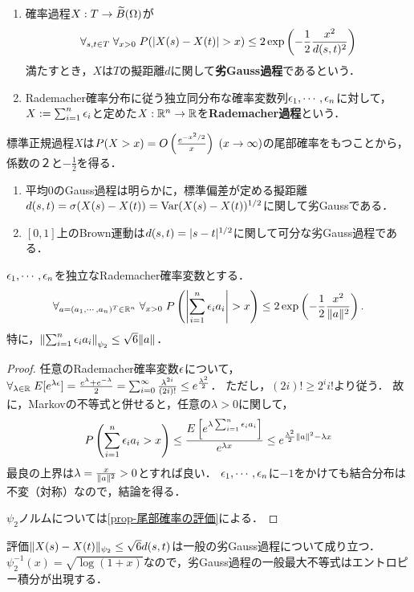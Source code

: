 \documentclass[uplatex,dvipdfmx]{jsreport}
\begin{document}
\begin{definition}\mbox{}
    \begin{enumerate}
        \item 確率過程$X:T\to\widetilde{B}(\Omega)$が
        \[\forall_{s,t\in T}\;\forall_{x>0}\;P(\lvert X(s)-X(t)\rvert>x)\le 2\exp\left(-\frac{1}{2}\frac{x^2}{d(s,t)^2}\right)\]
        満たすとき，$X$は$T$の擬距離$d$に関して\textbf{劣Gauss過程}であるという．
        \item Rademacher確率分布に従う独立同分布な確率変数列$\epsilon_1,\cdots,\epsilon_n$に対して，$X:=\sum^n_{i=1}\epsilon_i$と定めた$X:\mathbb{R}^n\to\mathbb{R}$を\textbf{Rademacher過程}という．
    \end{enumerate}
\end{definition}
\begin{remarks}
    標準正規過程$X$は$P(X>x)=O\left(\frac{e^{-x^2/2}}{x}\right)\;(x\to\infty)$の尾部確率をもつことから，係数の２と$-\frac{1}{2}$を得る．
\end{remarks}
\begin{example}\mbox{}
    \begin{enumerate}
        \item 平均$0$のGauss過程は明らかに，標準偏差が定める擬距離$d(s,t)=\sigma(X(s)-X(t))=\mathrm{Var}(X(s)-X(t))^{1/2}$に関して劣Gaussである．
        \item $[0,1]$上のBrown運動は$d(s,t)=\lvert s-t\rvert^{1/2}$に関して可分な劣Gauss過程である．
    \end{enumerate}
\end{example}

\begin{proposition}[Hoeffdingの不等式]
    $\epsilon_1,\cdots,\epsilon_n$を独立なRademacher確率変数とする．
    \[\forall_{a=(a_1,\cdots,a_n)^T\in\R^n}\;\forall_{x>0}\;P\paren{\Abs{\sum^n_{i=1}\ep_ia_i}>x}\le 2\exp\paren{-\frac{1}{2}\frac{x^2}{\norm{a}^2}}.\]
    特に，$\left\|\sum^n_{i=1}\epsilon_ia_i\right\|_{\psi_2}\le\sqrt{6}\|a\|$．
\end{proposition}
\begin{proof}
    任意のRademacher確率変数$\epsilon$について，$\forall_{\lambda\in\mathbb{R}}\;E[e^{\lambda\epsilon}]=\frac{e^\lambda+e^{-\lambda}}{2}=\sum^\infty_{i=0}\frac{\lambda^{2i}}{(2i)!}\le e^{\frac{\lambda^2}{2}}$．
    ただし，$(2i)!\ge 2^ii!$より従う．
    故に，Markovの不等式と併せると，任意の$\lambda>0$に関して，
    \[P\left(\sum^n_{i=1}\epsilon_ia_i>x\right)\le\frac{E\left[e^{\lambda\sum^n_{i=1}\epsilon_ia_i}\right]}{e^{\lambda x}}\le e^{\frac{\lambda^2}{2}\|a\|^2-\lambda x}\]
    最良の上界は$\lambda=\frac{x}{\|a\|^2}>0$とすれば良い．
    $\epsilon_1,\cdots,\epsilon_n$に$-1$をかけても結合分布は不変（対称）なので，結論を得る．

    $\psi_2$ノルムについては\ref{prop-尾部確率の評価}による．
\end{proof}
\begin{remark}
    評価$\|X(s)-X(t)\|_{\psi_2}\le\sqrt{6}d(s,t)$は一般の劣Gauss過程について成り立つ．
    $\psi_2^{-1}(x)=\sqrt{\log(1+x)}$なので，劣Gauss過程の一般最大不等式はエントロピー積分が出現する．
\end{remark}
\end{document}
